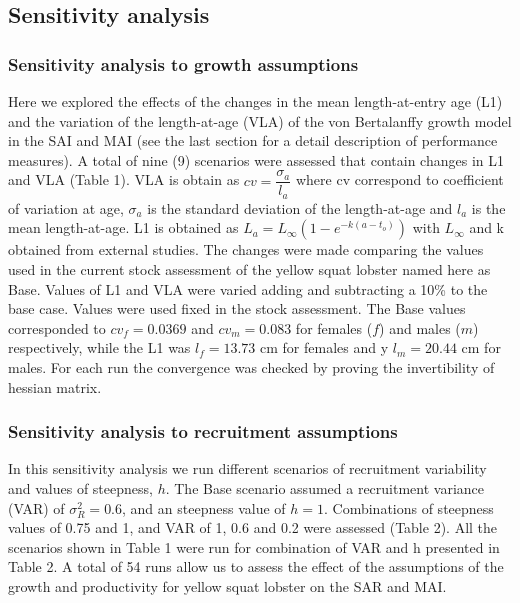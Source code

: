 \documentclass[11pt,letter,]{article}
\begin{document}
\subsection{Sensitivity analysis}\label{sensitivity-analysis}

\subsubsection{Sensitivity analysis to growth
assumptions}\label{sensitivity-analysis-to-growth-assumptions}

Here we explored the effects of the changes in the mean length-at-entry
age (L1) and the variation of the length-at-age (VLA) of the von
Bertalanffy growth model in the SAI and MAI (see the last section for a
detail description of performance measures). A total of nine (9)
scenarios were assessed that contain changes in L1 and VLA (Table 1).
VLA is obtain as \(cv=\dfrac{\sigma_a}{l_a}\) where cv correspond to
coefficient of variation at age, \(\sigma_a\) is the standard deviation
of the length-at-age and \(l_a\) is the mean length-at-age. L1 is
obtained as \(L_a=L_\infty( 1-e^{-k(a-t_o)})\) with \(L_\infty\) and k
obtained from external studies. The changes were made comparing the
values used in the current stock assessment of the yellow squat lobster
named here as Base. Values of L1 and VLA were varied adding and
subtracting a 10\% to the base case. Values were used fixed in the stock
assessment. The Base values corresponded to \(cv_f=0.0369\) and
\(cv_m=0.083\) for females (\(f\)) and males (\(m\)) respectively, while
the L1 was \(l_f=13.73\) cm for females and y \(l_m=20.44\) cm for
males. For each run the convergence was checked by proving the
invertibility of hessian matrix.

\subsubsection{Sensitivity analysis to recruitment
assumptions}\label{sensitivity-analysis-to-recruitment-assumptions}

In this sensitivity analysis we run different scenarios of recruitment
variability and values of steepness, \(h\). The Base scenario assumed a
recruitment variance (VAR) of \(\sigma^2_R=0.6\), and an steepness value
of \(h=1\). Combinations of steepness values of 0.75 and 1, and VAR of
1, 0.6 and 0.2 were assessed (Table 2). All the scenarios shown in Table
1 were run for combination of VAR and h presented in Table 2. A total of
54 runs allow us to assess the effect of the assumptions of the growth
and productivity for yellow squat lobster on the SAR and MAI.
\end{document}
